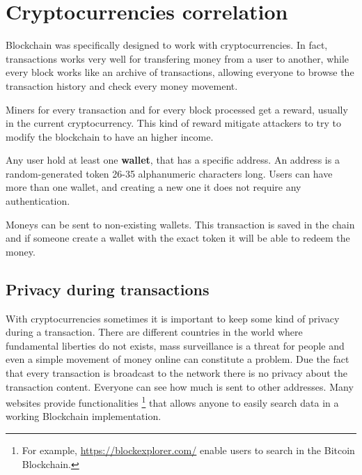 \section{Cryptocurrencies correlation}
\label{sec:crypto_corr}

Blockchain was specifically designed to work with cryptocurrencies. In fact,
transactions works very well for transfering money from a user to another, while
every block works like an archive of transactions, allowing everyone to browse
the transaction history and check every money movement.

Miners for every transaction and for every block processed get a reward,
usually in the current cryptocurrency. This kind of reward mitigate attackers to
try to modify the blockchain to have an higher income.

Any user hold at least one \textbf{wallet}, that has a specific address. An
address is a random-generated token 26-35 alphanumeric characters long. Users
can have more than one wallet, and creating a new one it does not require any
authentication.

Moneys can be sent to non-existing wallets. This transaction is saved in the
chain and if someone create a wallet with the exact token it will be able
to redeem the money.

\subsection{Privacy during transactions}



With cryptocurrencies sometimes it is important to keep some kind of privacy
during a transaction. There are different countries in the world where
fundamental liberties do not exists, mass surveillance is a threat for
people and even a simple movement of money online can constitute a problem.
Due the fact that every transaction is broadcast to the network there is no
privacy about the transaction content. Everyone can see how much is sent to
other addresses. Many websites provide functionalities \footnote{For example,
\url{https://blockexplorer.com/} enable users to search in the Bitcoin
Blockchain.} that allows anyone to easily search data in a working Blockchain
implementation.

